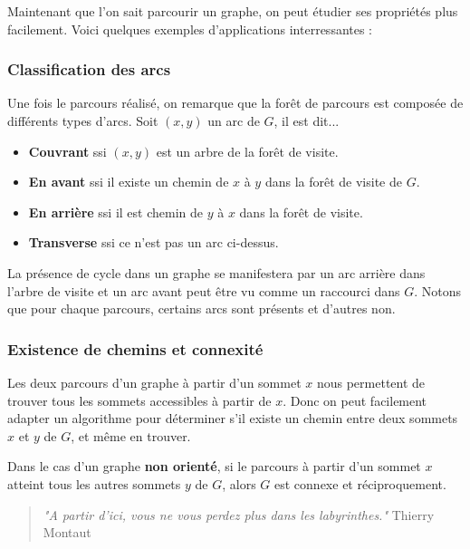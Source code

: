Maintenant que l'on sait parcourir un graphe, on peut étudier ses propriétés plus facilement.
Voici quelques exemples d'applications interressantes :

\subsubsection{Classification des arcs}

Une fois le parcours réalisé, on remarque que la forêt de parcours est composée de différents types d'arcs.
Soit $(x,y)$ un arc de $G$, il est dit...
\begin{itemize}
    \item \textbf{Couvrant} ssi $(x,y)$ est un arbre de la forêt de visite.
    \item \textbf{En avant} ssi il existe un chemin de $x$ à $y$ dans la forêt de visite de $G$.
    \item \textbf{En arrière} ssi il est chemin de $y$ à $x$ dans la forêt de visite.
    \item \textbf{Transverse} ssi ce n'est pas un arc ci-dessus.
\end{itemize}
La présence de cycle dans un graphe se manifestera par un arc arrière dans l'arbre de visite et un arc avant peut être vu comme un raccourci dans $G$.
Notons que pour chaque parcours, certains arcs sont présents et d'autres non.

\subsubsection{Existence de chemins et connexité}

Les deux parcours d'un graphe à partir d'un sommet $x$ nous permettent de trouver tous les sommets accessibles à partir de $x$.
Donc on peut facilement adapter un algorithme pour déterminer s'il existe un chemin entre deux sommets $x$ et $y$ de $G$, et même en trouver.

Dans le cas d'un graphe \textbf{non orienté}, si le parcours à partir d'un sommet $x$ atteint tous les autres sommets $y$ de $G$, alors $G$ est connexe et réciproquement.


\vspace{3cm}


\begin{quote}
    \centering
    \emph{"A partir d'ici, vous ne vous perdez plus dans les labyrinthes."} Thierry Montaut
    \justify
\end{quote}



